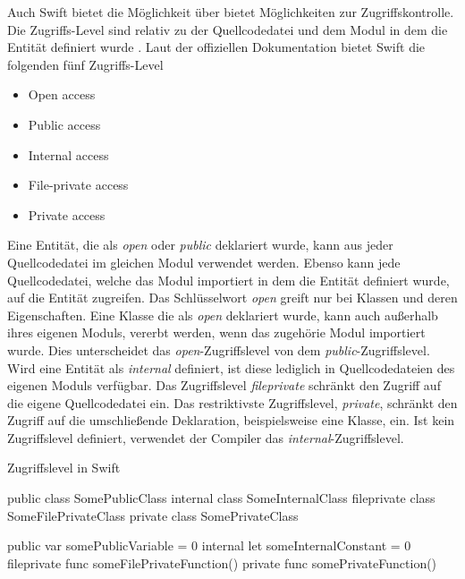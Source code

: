 Auch Swift bietet die Möglichkeit über bietet Möglichkeiten zur Zugriffskontrolle. 
Die Zugriffs-Level sind relativ zu der Quellcodedatei und dem Modul in dem die Entität definiert wurde \cite[S.394]{Apple.2017}.
Laut der offiziellen Dokumentation \cite[S.394]{Apple.2017} bietet Swift die folgenden fünf Zugriffs-Level

\begin{itemize}
    \item Open access
    \item Public access
    \item Internal access
    \item File-private access
    \item Private access
\end{itemize}

Eine Entität, die als \textit{open} oder \textit{public} deklariert wurde, kann aus jeder Quellcodedatei im gleichen Modul verwendet werden. 
Ebenso kann jede Quellcodedatei, welche das Modul importiert in dem die Entität definiert wurde, auf die Entität zugreifen. 
Das Schlüsselwort \textit{open} greift nur bei Klassen und deren Eigenschaften.
Eine Klasse die als \textit{open} deklariert wurde, kann auch außerhalb ihres eigenen Moduls, vererbt werden, wenn das zugehörie Modul importiert wurde.
Dies unterscheidet das \textit{open}-Zugriffslevel von dem \textit{public}-Zugriffslevel.
Wird eine Entität als \textit{internal} definiert, ist diese lediglich in Quellcodedateien des eigenen Moduls verfügbar. 
Das Zugriffslevel \textit{fileprivate} schränkt den Zugriff auf die eigene Quellcodedatei ein.
Das restriktivste Zugriffslevel, \textit{private}, schränkt den Zugriff auf die umschließende Deklaration, beispielsweise eine Klasse, ein.
Ist kein Zugriffslevel definiert, verwendet der Compiler das \textit{internal}-Zugriffslevel.

\begin{listing}
\caption{Zugriffslevel in Swift \cite[S.396]{Apple.2017}}
\label{lst:ZugriffslevelSwift}
\begin{SwiftCode}
public class SomePublicClass {}
internal class SomeInternalClass {}
fileprivate class SomeFilePrivateClass {}
private class SomePrivateClass {}

public var somePublicVariable = 0
internal let someInternalConstant = 0
fileprivate func someFilePrivateFunction() {}
private func somePrivateFunction() {}
\end{SwiftCode}
\end{listing}

